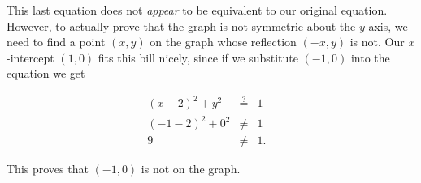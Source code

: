 This last equation does not \emph{appear} to be equivalent to our original equation.  However, to actually prove that the graph is not symmetric about the $y$-axis, we need to find a point $(x,y)$ on the graph whose reflection $(-x,y)$ is not. Our $x$-intercept $(1,0)$ fits this bill nicely, since if we substitute $(-1,0)$ into the equation we get

\[ \begin{array}{rclr}   

(x-2)^2+y^2 & \stackrel{?}{=} & 1 & \\
(-1-2)^2 + 0^2 & \neq & 1 & \\
9 & \neq & 1. & 

\end{array} \]

This proves that $(-1,0)$ is not on the graph.
